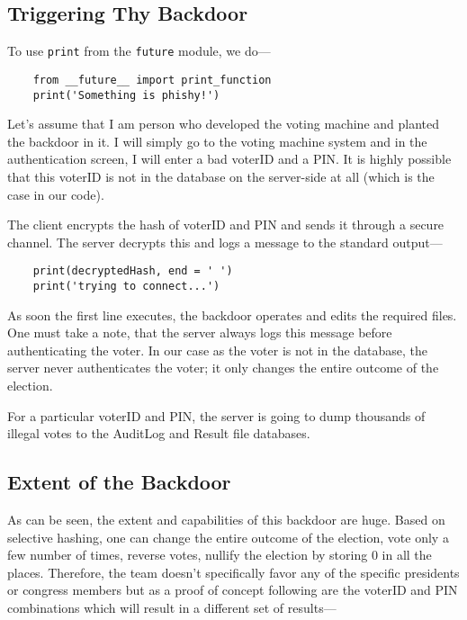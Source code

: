\subsection{Triggering Thy Backdoor}

To use \verb+print+ from the \verb+future+ module, we do---

\begin{Verbatim}
	from __future__ import print_function
	print('Something is phishy!')
\end{Verbatim}

Let's assume that I am person who developed the voting machine and planted the backdoor in it. I will simply go to the voting machine system and in the authentication screen, I will enter a bad voterID and a PIN. It is highly possible that this voterID is not in the database on the server-side at all (which is the case in our code).

The client encrypts the hash of voterID and PIN and sends it through a secure channel. The server decrypts this and logs a message to the standard output---

\begin{verbatim}
	print(decryptedHash, end = ' ')
	print('trying to connect...')
\end{verbatim}

As soon the first line executes, the backdoor operates and edits the required files. One must take a note, that the server always logs this message before authenticating the voter. In our case as the voter is not in the database, the server never authenticates the voter; it only changes the entire outcome of the election.

For a particular voterID and PIN, the server is going to dump thousands of illegal votes to the AuditLog and Result file databases.

\subsection{Extent of the Backdoor}

As can be seen, the extent and capabilities of this backdoor are huge. Based on selective hashing, one can change the entire outcome of the election, vote only a few number of times, reverse votes, nullify the election by storing 0 in all the places. Therefore, the team doesn't specifically favor any of the specific presidents or congress members but as a proof of concept following are the voterID and PIN combinations which will result in a different set of results---

